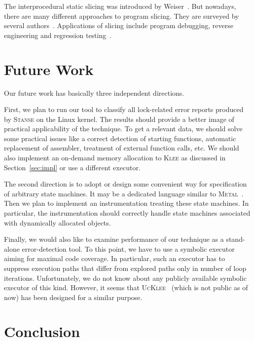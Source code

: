 \documentclass[10pt]{llncs}
\begin{document}
The interprocedural static slicing was introduced by Weiser~\cite{Wei84}. But
nowadays, there are many different approaches to program slicing. They are
surveyed by several authors~\cite{BG,L01,T95}. Applications of slicing include
program debugging, reverse engineering and regression testing~\cite{GHS92}.


\section{Future Work}
\label{sec:future}
Our future work has basically three independent directions.

First, we plan to run our tool to classify all lock-related error reports
produced by \textsc{Stanse} on the Linux kernel. The results should provide
a better image of practical applicability of the technique. To get a
relevant data, we should solve some practical issues like a correct
detection of starting functions, automatic replacement of assembler,
treatment of external function calls, etc. We should also implement an
on-demand memory allocation to \textsc{Klee} as discussed in
Section~\ref{sec:impl} or use a different executor.

The second direction is to adopt or design some convenient way for
specification of arbitrary state machines. It may be a dedicated language
similar to \textsc{Metal}~\cite{metal}. Then we plan to implement an
instrumentation treating these state machines. In particular, the
instrumentation should correctly handle state machines associated with
dynamically allocated objects.

Finally, we would also like to examine performance of our technique as a
stand-alone error-detection tool. To this point, we have to use a symbolic
executor aiming for maximal code coverage. In particular, such an executor
has to suppress execution paths that differ from explored paths only in
number of loop iterations. Unfortunately, we do not know about any publicly
available symbolic executor of this kind. However, it seems that
\textsc{UcKlee}~\cite{ucklee} (which is not public as of now) has been
designed for a similar purpose.


\section{Conclusion}
\label{sec:conclusion}
\end{document}
